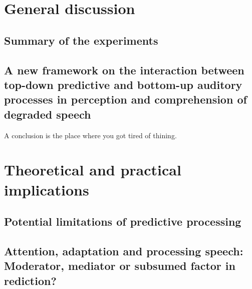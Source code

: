 \documentclass[a4paper, nobind]{templates/ociamthesis}
\begin{document}
\hypertarget{general-discussion}{%
\chapter{General discussion}\label{general-discussion}}

\hypertarget{summary-of-the-experiments}{%
\section{Summary of the experiments}\label{summary-of-the-experiments}}

\hypertarget{a-new-framework-on-the-interaction-between-top-down-predictive-and-bottom-up-auditory-processes-in-perception-and-comprehension-of-degraded-speech}{%
\section{A new framework on the interaction between top-down predictive and bottom-up auditory processes in perception and comprehension of degraded speech}\label{a-new-framework-on-the-interaction-between-top-down-predictive-and-bottom-up-auditory-processes-in-perception-and-comprehension-of-degraded-speech}}

\minitoc 

\begin{savequote}
A conclusion is the place where you got tired of thining.
\end{savequote}



\hypertarget{theoretical-and-practical-implications}{%
\chapter{Theoretical and practical implications}\label{theoretical-and-practical-implications}}

\hypertarget{potential-limitations-of-predictive-processing}{%
\section{Potential limitations of predictive processing}\label{potential-limitations-of-predictive-processing}}

\hypertarget{attention-adaptation-and-processing-speech-moderator-mediator-or-subsumed-factor-in-rediction}{%
\section{Attention, adaptation and processing speech: Moderator, mediator or subsumed factor in rediction?}\label{attention-adaptation-and-processing-speech-moderator-mediator-or-subsumed-factor-in-rediction}}
\end{document}
